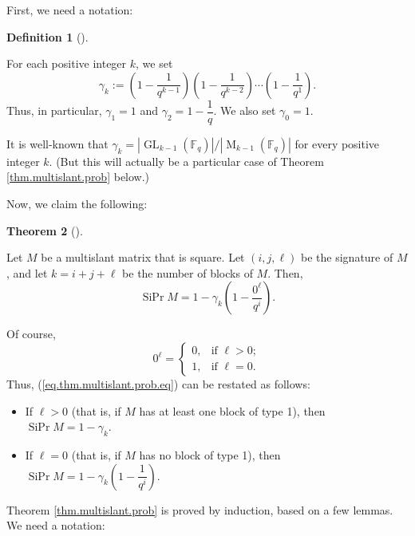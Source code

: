 \documentclass[numbers=enddot,12pt,final,onecolumn,notitlepage]{scrartcl}%
\theoremstyle{definition}
\newtheorem{theo}{Theorem}[section]
\newenvironment{theorem}[1][]
{\begin{theo}[#1]\begin{leftbar}}
{\end{leftbar}\end{theo}}
\newtheorem{defi}[theo]{Definition}
\newenvironment{definition}[1][]
{\begin{defi}[#1]\begin{leftbar}}
{\end{leftbar}\end{defi}}
\newcommand{\Fq}{\mathbb{F}_q}
\theoremstyle{plainsl}
\begin{document}
First, we need a notation:

\begin{definition}
\label{def.gammak}For each positive integer $k$, we set%
\[
\gamma_{k}:=\left(  1-\dfrac{1}{q^{k-1}}\right)  \left(  1-\dfrac{1}{q^{k-2}%
}\right)  \cdots\left(  1-\dfrac{1}{q^{1}}\right)  .
\]
Thus, in particular, $\gamma_{1}=1$ and $\gamma_{2}=1-\dfrac{1}{q}$. We also
set $\gamma_{0}=1$.
\end{definition}

It is well-known that $\gamma_{k}=\left\vert \operatorname*{GL}\nolimits_{k-1}%
\left(  \Fq\right)  \right\vert /\left\vert \operatorname*{M}\nolimits_{k-1}%
\left(  \Fq\right)  \right\vert $ for every positive integer $k$. (But this will
actually be a particular case of Theorem \ref{thm.multislant.prob} below.)

Now, we claim the following:

\begin{theorem}
\label{thm.multislant.prob}Let $M$ be a multislant matrix that is square. Let
$\left(  i,j,\ell\right)  $ be the signature of $M$, and let $k=i+j+\ell$ be
the number of blocks of $M$. Then,%
\begin{equation}
\operatorname*{SiPr}M=1-\gamma_{k}\left(  1-\dfrac{0^{\ell}}{q^{i}}\right)  .
\label{eq.thm.multislant.prob.eq}%
\end{equation}

\end{theorem}

Of course,
\[
0^{\ell}=%
\begin{cases}
0, & \text{if }\ell>0;\\
1, & \text{if }\ell=0.
\end{cases}
\]
Thus, (\ref{eq.thm.multislant.prob.eq}) can be restated as follows:

\begin{itemize}
\item If $\ell>0$ (that is, if $M$ has at least one block of type 1), then
$\operatorname*{SiPr}M=1-\gamma_{k}$.

\item If $\ell=0$ (that is, if $M$ has no block of type 1), then
$\operatorname*{SiPr}M=1-\gamma_{k}\left(  1-\dfrac{1}{q^{i}}\right)  $.
\end{itemize}

Theorem \ref{thm.multislant.prob} is proved by induction, based on a few
lemmas. We need a notation:
\end{document}
